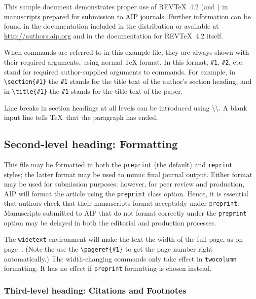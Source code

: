 \documentclass[%
 aip,
 jmp,%
 amsmath,amssymb,
preprint,%
 reprint,%
]{revtex4-2}
\begin{document}
This sample document demonstrates proper use of REV\TeX~4.2 (and
\LaTeXe) in manuscripts prepared for submission to AIP
journals. Further information can be found in the documentation included in the distribution or available at
\url{http://authors.aip.org} and in the documentation for
REV\TeX~4.2 itself.

When commands are referred to in this example file, they are always
shown with their required arguments, using normal \TeX{} format. In
this format, \verb+#1+, \verb+#2+, etc. stand for required
author-supplied arguments to commands. For example, in
\verb+\section{#1}+ the \verb+#1+ stands for the title text of the
author's section heading, and in \verb+\title{#1}+ the \verb+#1+
stands for the title text of the paper.

Line breaks in section headings at all levels can be introduced using
\textbackslash\textbackslash. A blank input line tells \TeX\ that the
paragraph has ended.

\subsection{\label{sec:level2}Second-level heading: Formatting}

This file may be formatted in both the \texttt{preprint} (the default) and
\texttt{reprint} styles; the latter format may be used to
mimic final journal output. Either format may be used for submission
purposes; however, for peer review and production, AIP will format the
article using the \texttt{preprint} class option. Hence, it is
essential that authors check that their manuscripts format acceptably
under \texttt{preprint}. Manuscripts submitted to AIP that do not
format correctly under the \texttt{preprint} option may be delayed in
both the editorial and production processes.

The \texttt{widetext} environment will make the text the width of the
full page, as on page~\pageref{eq:wideeq}. (Note the use the
\verb+\pageref{#1}+ to get the page number right automatically.) The
width-changing commands only take effect in \texttt{twocolumn}
formatting. It has no effect if \texttt{preprint} formatting is chosen
instead.

\subsubsection{\label{sec:level3}Third-level heading: Citations and Footnotes}
\end{document}
